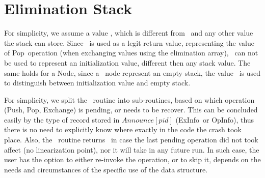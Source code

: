 
\newcommand{\push}{\mbox{\sc Push}}
\newcommand{\trypush}{\mbox{\sc TryPush}}
\newcommand{\recoverPush}{\mbox{\sc Push-Roceover}}
\newcommand{\pop}{\mbox{\sc Pop}}
\newcommand{\trypop}{\mbox{\sc TryPop}}
\newcommand{\recoverPop}{\mbox{\sc Pop-Recover}}
\newcommand{\exchange}{\mbox{\sc Exchange}}
\newcommand{\recoverExchange}{\mbox{\sc Exchange-Recover}}
\newcommand{\visit}{\mbox{\sc Visit}}
\newcommand{\switchPair}{\mbox{\sc SwitchPair}}


\newcommand{\emptyst}{\mbox{\sc Empty}}
\newcommand{\waiting}{\mbox{\sc Waiting}}
\newcommand{\busy}{\mbox{\sc Busy}}
\newcommand{\timeout}{\mbox{\sc Timeout}}

\newcommand{\opInfo}{\mbox{OpInfo}}
\newcommand{\pushInfo}{\mbox{PushInfo}}
\newcommand{\popInfo}{\mbox{PopInfo}}
\newcommand{\exInfo}{\mbox{ExInfo}}




\section{Elimination Stack}

For simplicity, we assume a value \init, which is different from \NULL\ and any other value the stack can store. Since \NULL\ is used as a legit return value, representing the value of \pop\ operation (when exchanging values using the elimination array), \NULL\ can not be used to represent an initialization value, different then any stack value. The same holds for a Node, since a \NULL\ node represent an empty stack, the value \init\ is used to distinguish between initialization value and empty stack.

For simplicity, we split the \recover\ routine into sub-routines, based on which operation (\push, \pop, \exchange) is pending, or needs to be recover. This can be concluded easily by the type of record stored in $Announce[pid]$ (\exInfo\ or \opInfo), thus there is no need to explicitly know where exactly in the code the crash took place. Also, the \recover\ routine returns \fail\ in case the last pending operation did not took affect (no linearization point), nor it will take in any future run. In such case, the user has the option to either re-invoke the operation, or to skip it, depends on the needs and circumstances of the specific use of the data structure.


